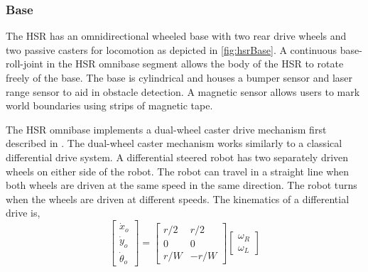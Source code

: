\documentclass[12pt]{article}
\begin{document}
        \subsubsection{Base} 
            The HSR has an omnidirectional wheeled base with two rear drive wheels and two passive casters for locomotion as depicted in \cref{fig:hsrBase}. A continuous base-roll-joint \footnotemark in the HSR omnibase segment allows the body of the HSR to rotate freely of the base. The base is cylindrical and houses a bumper sensor and laser range sensor to aid in obstacle detection. A magnetic sensor allows users to mark world boundaries using strips of magnetic tape.

            
            \par The HSR omnibase implements a dual-wheel caster drive mechanism first described in \cite{wada_caster_2000}. The dual-wheel caster mechanism works similarly to a classical differential drive system. A differential steered robot has two separately driven wheels on either side of the robot. The robot can travel in a straight line when both wheels are driven at the same speed in the same direction. The robot turns when the wheels are driven at different speeds. The kinematics of a differential drive is,
            \begin{equation}
                \begin{bmatrix}
                    \dot{x}_{o}\\
                    \dot{y}_{o}\\
                    \dot{\theta}_{o}
                \end{bmatrix}
                =
                \begin{bmatrix}
                    r/2 & r/2\\
                    0 & 0\\
                    r/W & -r/W
                \end{bmatrix}
                \begin{bmatrix}
                    \omega_{R}\\
                    \omega_{L}
                \end{bmatrix}
            \end{equation}
            
\end{document}
